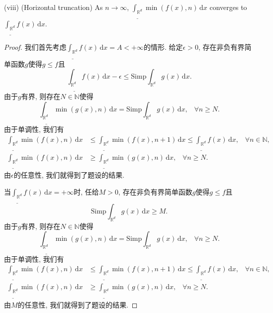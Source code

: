 \documentclass[reqno,a4paper,10pt]{amsart}
\newcommand\dif{\,\mathrm{d}}
\newcommand\Rnum{\mathbb{R}}
\begin{document}
(viii) (Horizontal truncation) As $n\to\infty$, $\underline{\int_{\Rnum^d}}\min(f(x),n)\dif x$ converges to $\underline{\int_{\Rnum^d}}f(x)\dif x$.
\begin{proof}
    我们首先考虑$\underline{\int_{\Rnum^d}}f(x)\dif x=A< +\infty$的情形. 给定$\epsilon>0$, 存在非负有界简单函数$g$使得$g\leq f $且
    \begin{equation*}
        \underline{\int_{\Rnum^d}}f(x)\dif x-\epsilon\leq \mathrm{Simp}\int_{\Rnum^d}g(x)\dif x.
    \end{equation*}
    由于$g$有界, 则存在$N\in\mathbb{N}$使得
    \begin{equation*}
        \underline{\int_{\Rnum^d}}\min(g(x),n)\dif x=\mathrm{Simp}\int_{\Rnum^d}g(x)\dif x,\;\;\;\forall n\geq N.
    \end{equation*}
    由于单调性, 我们有
    \begin{equation*}
        \begin{split}
            \underline{\int_{\Rnum^d}}\min(f(x),n)\dif x&\leq \underline{\int_{\Rnum^d}}\min(f(x),n+1)\dif x\leq \underline{\int_{\Rnum^d}}f(x)\dif x,\;\;\;\forall n\in\mathbb{N},\\
            \underline{\int_{\Rnum^d}}\min(f(x),n)\dif x&\geq \underline{\int_{\Rnum^d}}\min(g(x),n)\dif x,\;\;\;\forall n\geq N.
        \end{split}
    \end{equation*}
    由$\epsilon$的任意性, 我们就得到了题设的结果. 

    当$\underline{\int_{\Rnum^d}}f(x)\dif x=+\infty$时, 任给$M>0$, 存在非负有界简单函数$g$使得$g\leq f$且
    \begin{equation*}
        \mathrm{Simp}\int_{\Rnum^d}g(x)\dif x\geq M.
    \end{equation*}
    由于$g$有界, 则存在$N\in\mathbb{N}$使得
    \begin{equation*}
        \underline{\int_{\Rnum^d}}\min(g(x),n)\dif x=\mathrm{Simp}\int_{\Rnum^d}g(x)\dif x,\;\;\;\forall n\geq N.
    \end{equation*}
    由于单调性, 我们有
    \begin{equation*}
        \begin{split}
            \underline{\int_{\Rnum^d}}\min(f(x),n)\dif x&\leq \underline{\int_{\Rnum^d}}\min(f(x),n+1)\dif x\leq \underline{\int_{\Rnum^d}}f(x)\dif x,\;\;\;\forall n\in\mathbb{N},\\
            \underline{\int_{\Rnum^d}}\min(f(x),n)\dif x&\geq \underline{\int_{\Rnum^d}}\min(g(x),n)\dif x,\;\;\;\forall n\geq N.
        \end{split}
    \end{equation*}
    由$M$的任意性, 我们就得到了题设的结果. 
\end{proof}
\end{document}

